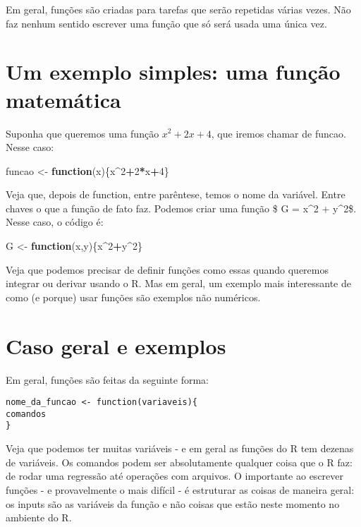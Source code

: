 \documentclass[]{book}
\newenvironment{Shaded}{\begin{snugshade}}{\end{snugshade}}
\newcommand{\DecValTok}[1]{\textcolor[rgb]{0.00,0.00,0.81}{#1}}
\newcommand{\StringTok}[1]{\textcolor[rgb]{0.31,0.60,0.02}{#1}}
\newcommand{\ControlFlowTok}[1]{\textcolor[rgb]{0.13,0.29,0.53}{\textbf{#1}}}
\newcommand{\OperatorTok}[1]{\textcolor[rgb]{0.81,0.36,0.00}{\textbf{#1}}}
\newcommand{\NormalTok}[1]{#1}
\begin{document}
Em geral, funções são criadas para tarefas que serão repetidas várias
vezes. Não faz nenhum sentido escrever uma função que só será usada uma
única vez.

\section{Um exemplo simples: uma função
matemática}\label{um-exemplo-simples-uma-funcao-matematica}

Suponha que queremos uma função \(x^2+2x+4\), que iremos chamar de
funcao. Nesse caso:

\begin{Shaded}
\begin{Highlighting}[]
\NormalTok{funcao <-}\StringTok{ }\ControlFlowTok{function}\NormalTok{(x)\{x}\OperatorTok{^}\DecValTok{2}\OperatorTok{+}\DecValTok{2}\OperatorTok{*}\NormalTok{x}\OperatorTok{+}\DecValTok{4}\NormalTok{\}}
\end{Highlighting}
\end{Shaded}

Veja que, depois de function, entre parêntese, temos o nome da variável.
Entre chaves o que a função de fato faz. Podemos criar uma função \$ G =
x\^{}2 + y\^{}2\$. Nesse caso, o código é:

\begin{Shaded}
\begin{Highlighting}[]
\NormalTok{G <-}\StringTok{ }\ControlFlowTok{function}\NormalTok{(x,y)\{x}\OperatorTok{^}\DecValTok{2}\OperatorTok{+}\NormalTok{y}\OperatorTok{^}\DecValTok{2}\NormalTok{\}}
\end{Highlighting}
\end{Shaded}

Veja que podemos precisar de definir funções como essas quando queremos
integrar ou derivar usando o R. Mas em geral, um exemplo mais
interessante de como (e porque) usar funções são exemplos não numéricos.

\section{Caso geral e exemplos}\label{caso-geral-e-exemplos}

Em geral, funções são feitas da seguinte forma:

\begin{verbatim}
nome_da_funcao <- function(variaveis){
comandos
}
\end{verbatim}

Veja que podemos ter muitas variáveis - e em geral as funções do R tem
dezenas de variáveis. Os comandos podem ser absolutamente qualquer coisa
que o R faz: de rodar uma regressão até operações com arquivos. O
importante ao escrever funções - e provavelmente o mais difícil - é
estruturar as coisas de maneira geral: os inputs são as variáveis da
função e não coisas que estão neste momento no ambiente do R.
\end{document}
